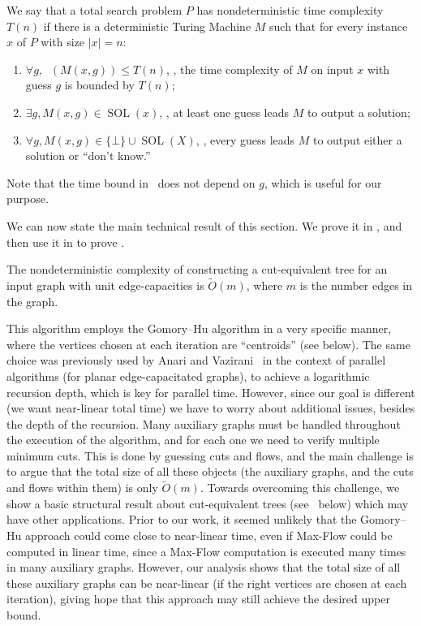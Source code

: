 \documentclass{toc}
\theoremstyle{plain}
\newcommand{\ProblemName}[1]{\textsf{#1}}
\newcommand{\MF}{\ProblemName{Max-Flow}\xspace}
\DeclareMathOperator{\SOL}{SOL}
\DeclareMathOperator{\THALT}{\mathsf{T_{HALT}}}
\newcommand\tO{\ensuremath{\widetilde O}}  %
\providecommand{\card}[1]{\lvert#1\rvert}
\begin{document}
\begin{definition}
We say that a total search problem $P$ has nondeterministic time complexity $T(n)$ if there is a deterministic Turing Machine $M$ such that for every instance $x$ of $P$ with size $\card{x}=n$:
\begin{enumerate}
\item \label{it:time}
  $\forall g, \THALT(M(x,g))\leq T(n)$,
  \ie, the time complexity of $M$ on input $x$ with guess $g$ is bounded by $T(n)$;
\item \label{it:a}
  $\exists g, M(x,g)\in \SOL(x)$, \ie, at least one guess leads $M$ to output a solution;
\item \label{it:b}
  $\forall g, M(x,g) \in \{\bot\}\cup \SOL(X)$, \ie, every guess leads $M$ to output either a solution or ``don't know.''
\end{enumerate}
Note that the time bound in~ does not depend on $g$, which is useful for our purpose.
\end{definition}

We can now state the main technical result of this section.
We prove it in ,
and then use it in  to prove .

\begin{theorem}\label{nondet:main}
The nondeterministic complexity of constructing a cut-equivalent tree
  for an input graph with unit edge-capacities is $\tO(m)$,
  where $m$ is the number edges in the graph.
\end{theorem}

This algorithm employs the Gomory--Hu algorithm in a very specific manner,
where the vertices chosen at each iteration are ``centroids'' (see below).
The same choice was previously used by Anari and Vazirani~\cite{AnariV18}
in the context of parallel algorithms (for planar edge-capacitated graphs),
to achieve a logarithmic recursion depth, which is key for parallel time.
However, since our goal is different (we want near-linear total time) we have to worry about additional issues, besides the depth of the recursion.
Many auxiliary graphs must be handled throughout the execution of the algorithm, and for each one we need to verify multiple minimum cuts.
This is done by guessing cuts and flows, and the main challenge is to argue that the total size of all these objects (the auxiliary graphs, and the cuts and flows within them) is only $\tO(m)$.
Towards overcoming this challenge, we show a basic structural result about cut-equivalent trees (see~ below) which may have other applications.
Prior to our work, it seemed unlikely that the Gomory--Hu approach could come close to near-linear time, even if \MF could be computed in linear time, since a \MF computation is executed many times in many auxiliary graphs.
However, our analysis shows that the total size of all these auxiliary graphs can be near-linear (if the right vertices are chosen at each iteration),
giving hope that this approach may still achieve the desired upper bound.
\end{document}
